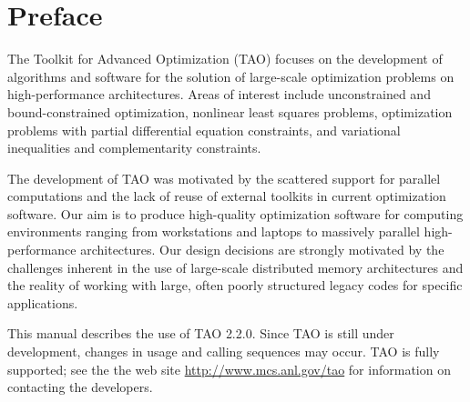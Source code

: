 
\section*{Preface}

The Toolkit for Advanced Optimization (TAO) focuses on the development
of algorithms and software for the solution of large-scale optimization 
problems on high-performance architectures.  Areas of interest include 
unconstrained and bound-constrained optimization, nonlinear least squares 
problems, optimization problems with partial differential equation 
constraints, and variational inequalities and complementarity 
constraints.

The development of TAO was motivated by the scattered support for
parallel computations and the lack of reuse of external toolkits in
current optimization software.  Our aim is to produce high-quality 
optimization software for computing environments ranging from 
workstations and laptops to massively parallel high-performance 
architectures.  Our design decisions are strongly motivated by 
the challenges inherent in the use of large-scale distributed 
memory architectures and the reality of working with large, 
often poorly structured legacy codes for specific 
applications.

This manual describes the use of TAO 2.2.0.  Since TAO is still under 
development, changes in usage and calling sequences may occur.  TAO 
is fully supported; see the the web site \url{http://www.mcs.anl.gov/tao} 
for information on contacting the developers.



